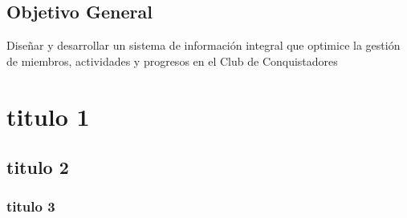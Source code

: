\documentclass[stu, 12pt, letterpaper, donotrepeattitle, floatsintext, natbib]{apa7}
\begin{document}
    \subsection{Objetivo General}
    Diseñar y desarrollar un sistema de información integral que optimice la gestión de miembros, actividades y progresos en el Club de Conquistadores

    \section{titulo 1}

    \subsection{titulo 2}

    \subsubsection{titulo 3}
\end{document}
